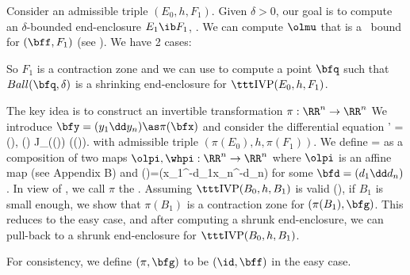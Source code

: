 
	Consider an admissible triple $(E_0, h, F_1)$.
	Given $\delta>0$,
	our goal is to compute an $\delta$-bounded
	end-enclosure $E_1\ib F_1$, .
	We can compute $\olmu$ that is a \lognorm\ bound for $(\bff, F_1)$
	(see ).  We have 2 cases:

	So $F_1$ is a contraction zone and we
	can use  to compute
	a point $\bfq$ such that $Ball(\bfq,\delta)$ is a shrinking
	end-enclosure for $\ivp(E_0,h,F_1)$.
	
	The key idea is to construct an invertible transformation
			$\pi:\RR^n\to\RR^n$
	We introduce $\bfy =(y_1\dd y_n) \as \pi(\bfx)$ and consider the
	differential equation
			\bfy' = \bfg(\bfy), \qquad
				\bfg(\bfy) \as J_{\pi}(\pi\inv(\bfy))\Bigcdot
				\bff(\pi\inv(\bfy)).
		\eeql
	with admissible triple $(\pi(E_0),h,\pi(F_1))$.
	We define 
			\pi=\whpi\circ \olpi
		\eeql
	as a composition of two maps $\olpi, \whpi :\RR^n\to\RR^n$ where
	$\olpi$ is an affine map (see Appendix B)
	and 
			\whpi(\bfx)=(x_1^{-d_1}\dd x_n^{-d_n})
		\eeql
	for some $\bfd=(d_1\dd d_n)$.  In view of , we
	call $\pi$ the . 
	Assuming $\ivp(B_0,h,B_1)$ is valid (),
	if $B_1$ is small enough, we show that $\pi(B_1)$
	is a contraction zone for $(\pi(B_1), \bfg)$.  This reduces
	to the easy case, and after computing a shrunk end-enclosure,
	we can pull-back to a shrunk end-enclosure for $\ivp(B_0,h,B_1)$.

	For consistency, we define $(\pi,\bfg)$ to be $(\id, \bff)$
	in the easy case.
